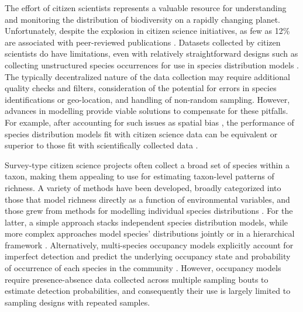 \documentclass[preprint,review,times,12pt,3p]{elsarticle}
\begin{document}
The effort of citizen scientists represents a valuable resource for understanding and monitoring the distribution of biodiversity on a rapidly changing planet. Unfortunately, despite the explosion in citizen science initiatives, as few as 12\% are associated with peer-reviewed publications \citep{Theobald2015}. Datasets collected by citizen scientists do have limitations, even with relatively straightforward designs such as collecting unstructured species occurrences for use in species distribution models \citep{Theobald2015,Steen2019,Duan2020,Henckel2020}. The typically decentralized nature of the data collection may require additional quality checks and filters, consideration of the potential for errors in species identifications or geo-location, and handling of non-random sampling. However, advances in modelling provide viable solutions to compensate for these pitfalls. For example, after accounting for such issues as spatial bias \citep{Isaac2014,Steen2019,Johnston2020,Robinson2020}, the performance of species distribution models fit with citizen science data can be equivalent or superior to those fit with scientifically collected data \citep{Steen2019,Sumner2019,Henckel2020}. 

Survey-type citizen science projects often collect a broad set of species within a taxon, making them appealing to use for estimating taxon-level patterns of richness. A variety of methods have been developed, broadly categorized into those that model richness directly as a function of environmental variables, and those grew from methods for modelling individual species distributions \citep{Dubuis2011,Guisan2011,Calabrese2014,Biber2019}. For the latter, a simple approach stacks independent species distribution models, while more complex approaches model species' distributions jointly or in a hierarchical framework \citep{Caradima2019}. Alternatively, multi-species occupancy models explicitly account for imperfect detection and predict the underlying occupancy state and probability of occurrence of each species in the community \citep{Frishkoff2019,Guillera-Arroita2019,Szewczyk2018,Devarajan2020}. However, occupancy models require presence-absence data collected across multiple sampling bouts to estimate detection probabilities, and consequently their use is largely limited to sampling designs with repeated samples.
\end{document}
